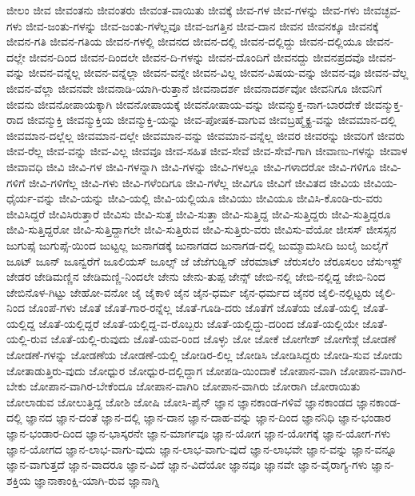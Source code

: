 {ಜೀಲಂ
ಜೀವ
ಜೀವಂತನು
ಜೀವಂತರು
ಜೀವಂತ-ವಾಯಿತು
ಜೀವಕ್ಕೆ
ಜೀವ-ಗಳ
ಜೀವ-ಗಳನ್ನು
ಜೀವ-ಗಳು
ಜೀವಚ್ಛವ-ಗಳು
ಜೀವ-ಜಂತು-ಗಳನ್ನು
ಜೀವ-ಜಂತು-ಗಳೆಲ್ಲವೂ
ಜೀವ-ಜಗತ್ತಿನ
ಜೀವ-ದಾನ
ಜೀವನ
ಜೀವನಕ್ಕೂ
ಜೀವನಕ್ಕೆ
ಜೀವನ-ಗತಿ
ಜೀವನ-ಗತಿಯ
ಜೀವನ-ಗಳಲ್ಲಿ
ಜೀವನದ
ಜೀವನ-ದಲ್ಲಿ
ಜೀವನ-ದಲ್ಲಿದ್ದು
ಜೀವನ-ದಲ್ಲಿಯೂ
ಜೀವನ-ದಲ್ಲೇ
ಜೀವನ-ದಿಂದ
ಜೀವನ-ದಿಂದಲೇ
ಜೀವನ-ದಿ-ಗಳನ್ನು
ಜೀವನ-ದೊಂದಿಗೆ
ಜೀವನದ್ದು
ಜೀವನಪ್ರದವೊ
ಜೀವನ-ವನ್ನು
ಜೀವನ-ವನ್ನೆಲ್ಲ
ಜೀವನ-ವನ್ನೆಲ್ಲಾ
ಜೀವನ-ವನ್ನೇ
ಜೀವನ-ವಿಲ್ಲ
ಜೀವನ-ವಿಷಯ-ವನ್ನು
ಜೀವನ-ವೂ
ಜೀವನ-ವೆಲ್ಲ
ಜೀವನ-ವೆಲ್ಲಾ
ಜೀವನವೇ
ಜೀವನಾಡಿ-ಯಾಗಿ-ರುತ್ತಾನೆ
ಜೀವನಾದರ್ಶ
ಜೀವನಾದರ್ಶವೋ
ಜೀವನಿಗೂ
ಜೀವನಿಗೆ
ಜೀವನು
ಜೀವನೋಪಾಯಕ್ಕಾಗಿ
ಜೀವನೋಪಾಯಕ್ಕೆ
ಜೀವನೋಪಾಯ-ವನ್ನು
ಜೀವನ್ಮುಕ್ತ-ನಾಗ-ಬಾರದೇಕೆ
ಜೀವನ್ಮುಕ್ತ-ರಾದ
ಜೀವನ್ಮುಕ್ತಿ
ಜೀವನ್ಮುಕ್ತಿಯ
ಜೀವನ್ಮುಕ್ತಿ-ಯನ್ನು
ಜೀವ-ಪೋಷಕ-ವಾಗುವ
ಜೀವಬ್ರಹ್ಮೈಕ್ಯ-ವನ್ನು
ಜೀವಮಾನ-ದಲ್ಲಿ
ಜೀವಮಾನ-ದಲ್ಲೆಲ್ಲ
ಜೀವಮಾನ-ದಲ್ಲೇ
ಜೀವಮಾನ-ವನ್ನು
ಜೀವಮಾನ-ವನ್ನೆಲ್ಲ
ಜೀವರ
ಜೀವರನ್ನು
ಜೀವರಿಗೆ
ಜೀವರು
ಜೀವ-ರೆಲ್ಲ
ಜೀವ-ವನ್ನು
ಜೀವ-ವಿಲ್ಲ
ಜೀವವೂ
ಜೀವ-ಸಹಿತ
ಜೀವ-ಸೇವೆ
ಜೀವ-ಸೇವೆ-ಗಾಗಿ
ಜೀವಾಣು-ಗಳನ್ನು
ಜೀವಾಳ
ಜೀವಾವಧಿ
ಜೀವಿ
ಜೀವಿ-ಗಳ
ಜೀವಿ-ಗಳನ್ನಾಗಿ
ಜೀವಿ-ಗಳನ್ನು
ಜೀವಿ-ಗಳಲ್ಲೂ
ಜೀವಿ-ಗಳಾದರೋ
ಜೀವಿ-ಗಳಿಗೂ
ಜೀವಿ-ಗಳಿಗೆ
ಜೀವಿ-ಗಳಿಗೆಲ್ಲ
ಜೀವಿ-ಗಳು
ಜೀವಿ-ಗಳೆಂದಿಗೂ
ಜೀವಿ-ಗಳೆಲ್ಲ
ಜೀವಿಗೂ
ಜೀವಿಗೆ
ಜೀವಿತದ
ಜೀವಿಯ
ಜೀವಿಯ-ಧೈರ್ಯ-ವನ್ನು
ಜೀವಿ-ಯನ್ನು
ಜೀವಿ-ಯಲ್ಲಿ
ಜೀವಿ-ಯಲ್ಲಿಯೂ
ಜೀವಿಯು
ಜೀವಿಯೂ
ಜೀವಿಸಿ-ಕೊಂಡಿ-ರು-ವರು
ಜೀವಿಸಿದ್ದರೆ
ಜೀವಿಸಿರುತ್ತಾರೆ
ಜೀವಿಸು
ಜೀವಿ-ಸುತ್ತ
ಜೀವಿ-ಸುತ್ತಾ
ಜೀವಿ-ಸುತ್ತಿದ್ದ
ಜೀವಿ-ಸುತ್ತಿದ್ದರು
ಜೀವಿ-ಸುತ್ತಿದ್ದರೂ
ಜೀವಿ-ಸುತ್ತಿದ್ದರೋ
ಜೀವಿ-ಸುತ್ತಿದ್ದಾಗಲೇ
ಜೀವಿ-ಸುತ್ತಿರುವ
ಜೀವಿ-ಸುತ್ತಿರು-ವರು
ಜೀವಿಸು-ವೆಯೋ
ಜೀಸಸ್
ಜೀಸಸ್ಸನ
ಜುಗುಪ್ಸೆ
ಜುಗುಪ್ಸೆ-ಯಿಂದ
ಜುಟ್ಟಲ್ಲ
ಜುನಾಗಡಕ್ಕೆ
ಜುನಾಗಡದ
ಜುನಾಗಡ-ದಲ್ಲಿ
ಜುಮ್ಮಾಮಸೀದಿ
ಜುಲೈ
ಜುಲೈಗೆ
ಜೂಟ್
ಜೂನ್
ಜೂನ್ವರೆಗೆ
ಜೂಲಿಯಸ್
ಜೂಲ್ಸ್
ಜೆ
ಜೆಜೆಗುಡ್ವಿನ್
ಜೆರಮಾಟ್
ಜೆರುಸಲೆಂ
ಜೆರೂಸಲಂ
ಜೆಸುಇಸ್ಟ್
ಜೇಡರ
ಜೇಡಿಮಣ್ಣಿನ
ಜೇಡಿಮಣ್ಣಿ-ನಿಂದಲೇ
ಜೇನು
ಜೇನು-ತುಪ್ಪ
ಜೇನ್ಸ್
ಜೇಬಿ-ನಲ್ಲಿ
ಜೇಬಿ-ನಲ್ಲಿದ್ದ
ಜೇಬಿ-ನಿಂದ
ಜೇಬಿನೊಳ-ಗಿಟ್ಟು
ಜೇಹೋ-ವನೋ
ಜೈ
ಜೈಕಾಳಿ
ಜೈನ
ಜೈನ-ಧರ್ಮ
ಜೈನ-ಧರ್ಮದ
ಜೈನರ
ಜೈಲಿ-ನಲ್ಲಿಟ್ಟರು
ಜೈಲಿ-ನಿಂದ
ಜೊಂಪೆ-ಗಳು
ಜೊತೆ
ಜೊತೆ-ಗಾರ-ರನ್ನೆಲ್ಲ
ಜೊತೆ-ಗೂಡಿ-ದರು
ಜೊತೆಗೆ
ಜೊತೆಯ
ಜೊತೆ-ಯಲ್ಲಿ
ಜೊತೆ-ಯಲ್ಲಿದ್ದ
ಜೊತೆ-ಯಲ್ಲಿದ್ದರೆ
ಜೊತೆ-ಯಲ್ಲಿದ್ದ-ವ-ರೊಬ್ಬರು
ಜೊತೆ-ಯಲ್ಲಿದ್ದು-ದರಿಂದ
ಜೊತೆ-ಯಲ್ಲಿಯೇ
ಜೊತೆ-ಯಲ್ಲಿ-ರುವ
ಜೊತೆ-ಯಲ್ಲಿ-ರುವುದು
ಜೊತೆ-ಯವ-ರಿಂದ
ಜೊಳ್ಳು
ಜೋ
ಜೋಕೆ
ಜೋಗೇಶ್
ಜೋಗೇಶ್ಗೆ
ಜೋಡಣೆ
ಜೋಡಣೆ-ಗಳನ್ನು
ಜೋಡಣೆಯ
ಜೋಡಣೆ-ಯಲ್ಲಿ
ಜೋಡಿರ-ಲಿಲ್ಲ
ಜೋಡಿಸಿ
ಜೋಡಿಸಿದ್ದರು
ಜೋಡಿ-ಸುವ
ಜೋಡು
ಜೋತಾಡುತ್ತಿರು-ವುದು
ಜೋಧ್ಪುರ
ಜೋಧ್ಪುರ-ದಲ್ಲಿದ್ದಾಗ
ಜೋಪಡಿ-ಯಿಂದಾಕೆ
ಜೋಪಾನ-ವಾಗಿ
ಜೋಪಾನ-ವಾಗಿರ-ಬೇಕು
ಜೋಪಾನ-ವಾಗಿರ-ಬೇಕೆಂದೂ
ಜೋಪಾನ-ವಾಗಿರಿ
ಜೋಪಾನ-ವಾಗಿರು
ಜೋರಾಗಿ
ಜೋರಾಯಿತು
ಜೋಲಾಡುವ
ಜೋಲುತ್ತಿದ್ದ
ಜೋಶಿ
ಜೋಷಿ
ಜೋಸಿ-ಪೈನ್
ಜ್ಞಾನ
ಜ್ಞಾನಕಾಂಡ-ಗಳಿವೆ
ಜ್ಞಾನಕಾಂಡದ
ಜ್ಞಾನಕಾಂಡ-ದಲ್ಲಿ
ಜ್ಞಾನದ
ಜ್ಞಾನ-ದಂತೆ
ಜ್ಞಾನ-ದಲ್ಲಿ
ಜ್ಞಾನ-ದಾನ
ಜ್ಞಾನ-ದಾಹ-ವನ್ನು
ಜ್ಞಾನ-ದಿಂದ
ಜ್ಞಾನನಿಧಿ
ಜ್ಞಾನ-ಭಂಡಾರ
ಜ್ಞಾನ-ಭಂಡಾರ-ದಿಂದ
ಜ್ಞಾನ-ಭಾಸ್ಕರನೇ
ಜ್ಞಾನ-ಮಾರ್ಗವೂ
ಜ್ಞಾನ-ಯೋಗ
ಜ್ಞಾನ-ಯೋಗಕ್ಕೆ
ಜ್ಞಾನ-ಯೋಗ-ಗಳು
ಜ್ಞಾನ-ಯೋಗದ
ಜ್ಞಾನ-ಲಾಭ-ವಾಗು-ವುದು
ಜ್ಞಾನ-ಲಾಭ-ವಾಗು-ವುದೆ
ಜ್ಞಾನ-ಲಾಭವೇ
ಜ್ಞಾನ-ವನ್ನು
ಜ್ಞಾನ-ವನ್ನೂ
ಜ್ಞಾನ-ವಾಗುತ್ತದೆ
ಜ್ಞಾನ-ವಾದರೂ
ಜ್ಞಾನ-ವಿದೆ
ಜ್ಞಾನ-ವಿದೆಯೋ
ಜ್ಞಾನವೂ
ಜ್ಞಾನವೇ
ಜ್ಞಾನ-ವೈರಾಗ್ಯ-ಗಳು
ಜ್ಞಾನ-ಶಕ್ತಿಯ
ಜ್ಞಾನಾಕಾಂಕ್ಷಿ-ಯಾಗಿ-ರುವ
ಜ್ಞಾನಾಗ್ನಿ
}
